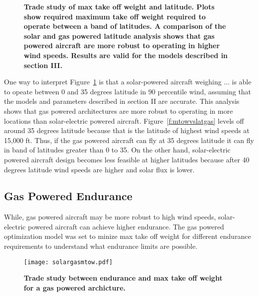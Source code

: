 \documentclass[]{aiaa-tc}%
\begin{document}
\begin{figure}[H]
 \begin{subfigmatrix}{2}%
 \end{subfigmatrix}
 \caption{\textbf{ Trade study of max take off weight and latitude. Plots show required maximum take off weight required to operate between a band of latitudes.   A comparison of the solar and gas powered latitude analysis shows that gas powered aircraft are more robust to operating in higher wind speeds. Results are valid for the models described in section III.}}
 \label{f:latvsmtowtrade}
\end{figure}

One way to interpret Figure~\ref{f:latvsmtowtrade} is that a solar-powered aircraft weighing ... is able to opeate between 0 and 35 degrees latitude in 90 percentile wind, assuming that the models and parameters described in section II are accurate.  
This analysis shows that gas powered architectures are more robust to operating in more locations than solar-electric powered aircraft.  
Figure~\ref{f:mtowvslatgas} levels off around 35 degrees latitude because that is the latitude of highest wind speeds at 15,000 ft.  
Thus, if the gas powered aircraft can fly at 35 degrees latitude it can fly in band of latitudes greater than 0 to 35.  
On the other hand, solar-electric powered aircraft design becomes less feasible at higher latitudes because after 40 degrees latitude wind speeds are higher and solar flux is lower. 

\subsection{Gas Powered Endurance}

While, gas powered aircraft may be more robust to high wind speeds, solar-electric powered aircraft can achieve higher endurance. 
The gas powered optimization model was set to minize max take off weight for different endurance requirements to understand what endurance limits are possible. 

\begin{figure}[H]
	\begin{center}
	\texttt{[image: solargasmtow.pdf]}
    \caption{ \textbf{ Trade study between endurance and max take off weight for a gas powered archicture. }}
	\label{f:solargasmtow}
	\end{center}
\end{figure}
\end{document}
